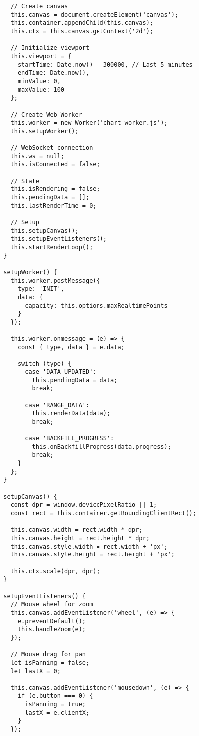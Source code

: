 \documentclass[11pt]{article}
\begin{document}
\begin{verbatim}
    // Create canvas
    this.canvas = document.createElement('canvas');
    this.container.appendChild(this.canvas);
    this.ctx = this.canvas.getContext('2d');
    
    // Initialize viewport
    this.viewport = {
      startTime: Date.now() - 300000, // Last 5 minutes
      endTime: Date.now(),
      minValue: 0,
      maxValue: 100
    };
    
    // Create Web Worker
    this.worker = new Worker('chart-worker.js');
    this.setupWorker();
    
    // WebSocket connection
    this.ws = null;
    this.isConnected = false;
    
    // State
    this.isRendering = false;
    this.pendingData = [];
    this.lastRenderTime = 0;
    
    // Setup
    this.setupCanvas();
    this.setupEventListeners();
    this.startRenderLoop();
  }
  
  setupWorker() {
    this.worker.postMessage({
      type: 'INIT',
      data: {
        capacity: this.options.maxRealtimePoints
      }
    });
    
    this.worker.onmessage = (e) => {
      const { type, data } = e.data;
      
      switch (type) {
        case 'DATA_UPDATED':
          this.pendingData = data;
          break;
          
        case 'RANGE_DATA':
          this.renderData(data);
          break;
          
        case 'BACKFILL_PROGRESS':
          this.onBackfillProgress(data.progress);
          break;
      }
    };
  }
  
  setupCanvas() {
    const dpr = window.devicePixelRatio || 1;
    const rect = this.container.getBoundingClientRect();
    
    this.canvas.width = rect.width * dpr;
    this.canvas.height = rect.height * dpr;
    this.canvas.style.width = rect.width + 'px';
    this.canvas.style.height = rect.height + 'px';
    
    this.ctx.scale(dpr, dpr);
  }
  
  setupEventListeners() {
    // Mouse wheel for zoom
    this.canvas.addEventListener('wheel', (e) => {
      e.preventDefault();
      this.handleZoom(e);
    });
    
    // Mouse drag for pan
    let isPanning = false;
    let lastX = 0;
    
    this.canvas.addEventListener('mousedown', (e) => {
      if (e.button === 0) {
        isPanning = true;
        lastX = e.clientX;
      }
    });
    

\end{verbatim}
\end{document}
